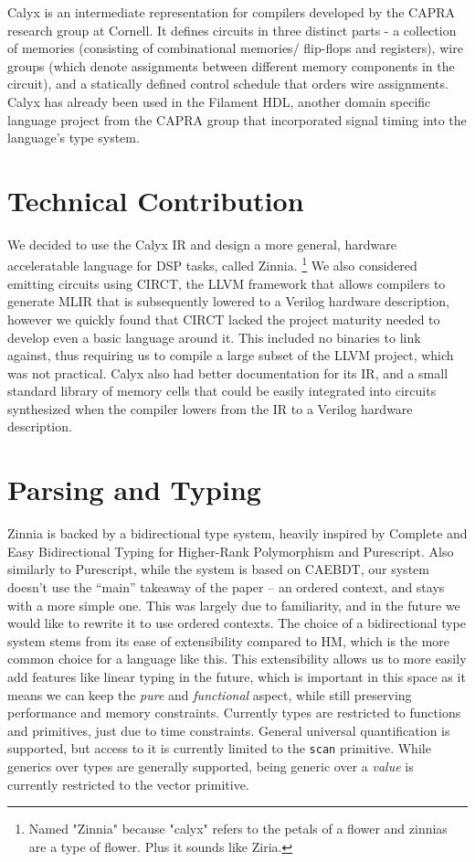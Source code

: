 \documentclass[12pt]{article}
\begin{document}
Calyx is an intermediate representation for compilers developed by the CAPRA research group at Cornell.
It defines circuits in three distinct parts - a collection of memories (consisting of combinational memories/
flip-flops and registers), wire groups (which denote assignments between different memory components
in the circuit), and a statically defined control schedule that orders wire assignments.
Calyx has already been used in the Filament HDL, another domain specific language project from the CAPRA
group that incorporated signal timing into the language's type system.

\section{Technical Contribution}
We decided to use the Calyx IR and design a more general, hardware acceleratable language for DSP tasks, called Zinnia.
\footnote{Named "Zinnia" because "calyx" refers to the petals of a flower and zinnias are a type of flower. Plus it sounds like Ziria.}
We also considered emitting circuits using CIRCT, the LLVM framework that allows compilers to generate
MLIR that is subsequently lowered to a Verilog hardware description, however we quickly found that
CIRCT lacked the project maturity needed to develop even a basic language around it. This included
no binaries to link against, thus requiring us to compile a large subset of the LLVM project, which was not practical.
Calyx also had better documentation for its IR, and a small standard library of memory cells that could be easily integrated
into circuits synthesized when the compiler lowers from the IR to a Verilog hardware description.

\section{Parsing and Typing}
Zinnia is backed by a bidirectional type system, heavily inspired by Complete and Easy Bidirectional Typing for Higher-Rank Polymorphism and Purescript. Also similarly to Purescript, while the system is based on CAEBDT, our system doesn't use the ``main'' takeaway of the paper -- an ordered context, and stays with a more simple one. This was largely due to familiarity, and in the future we would like to rewrite it to use ordered contexts. The choice of a bidirectional type system stems from its ease of extensibility compared to HM, which is the more common choice for a language like this. This extensibility allows us to more easily add features like linear typing in the future, which is important in this space as it means we can keep the \textit{pure} and \textit{functional} aspect, while still preserving performance and memory constraints. Currently types are restricted to functions and primitives, just due to time constraints. General universal quantification is supported, but access to it is currently limited to the \texttt{scan} primitive. While generics over types are generally supported, being generic over a \textit{value} is currently restricted to the vector primitive.
\end{document}
